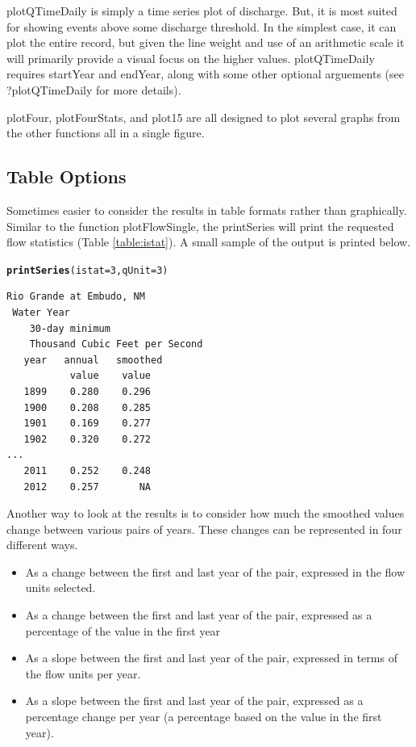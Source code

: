 \documentclass[a4paper,11pt]{article}\usepackage{graphicx, color}
\makeatletter
\newcommand{\hlfunctioncall}[1]{\textcolor[rgb]{0.501960784313725,0,0.329411764705882}{\textbf{#1}}}%
\newenvironment{kframe}{%
 \def\at@end@of@kframe{}%
 \ifinner\ifhmode%
  \def\at@end@of@kframe{\end{minipage}}%
  \begin{minipage}{\columnwidth}%
 \fi\fi%
 \def\FrameCommand##1{\hskip\@totalleftmargin \hskip-\fboxsep
 \colorbox{shadecolor}{##1}\hskip-\fboxsep
     \hskip-\linewidth \hskip-\@totalleftmargin \hskip\columnwidth}%
 \MakeFramed {\advance\hsize-\width
   \@totalleftmargin\z@ \linewidth\hsize
   \@setminipage}}%
 {\par\unskip\endMakeFramed%
 \at@end@of@kframe}
\newenvironment{knitrout}{}{} %
\makeatother
\begin{document}
plotQTimeDaily is simply a time series plot of discharge.  But, it is most suited for showing events above some discharge threshold.  In the simplest case, it can plot the entire record, but given the line weight and use of an arithmetic scale it will primarily provide a visual focus on the higher values. plotQTimeDaily requires startYear and endYear, along with some other optional arguements (see ?plotQTimeDaily for more details).

plotFour, plotFourStats, and plot15 are all designed to plot several graphs from the other functions all in a single figure. 

\FloatBarrier

\subsection{Table Options}
\label{sec:tableOptions}
Sometimes easier to consider the results in table formats rather than graphically. Similar to the function plotFlowSingle, the printSeries will print the requested flow statistics (Table \ref{table:istat}). A small sample of the output is printed below.


\begin{knitrout}
\color{fgcolor}\begin{kframe}
\begin{alltt}
\hlfunctioncall{printSeries}(istat=3, qUnit=3)
\end{alltt}
\end{kframe}
\end{knitrout}


\begin{verbatim}
Rio Grande at Embudo, NM
 Water Year
    30-day minimum
    Thousand Cubic Feet per Second
   year   annual   smoothed
           value    value
   1899    0.280    0.296
   1900    0.208    0.285
   1901    0.169    0.277
   1902    0.320    0.272
...
   2011    0.252    0.248
   2012    0.257       NA
\end{verbatim}

Another way to look at the results is to consider how much the smoothed values change between various pairs of years.  These changes can be represented in four different ways.  
\begin{itemize}
  \item As a change between the first and last year of the pair, expressed in the flow units selected.
  \item As a change between the first and last year of the pair, expressed as a percentage of the value in the first year
  \item As a slope between the first and last year of the pair, expressed in terms of the flow units per year.
  \item As a slope between the first and last year of the pair, expressed as a percentage change per year (a percentage based on the value in the first year).
\end{itemize}
\end{document}
